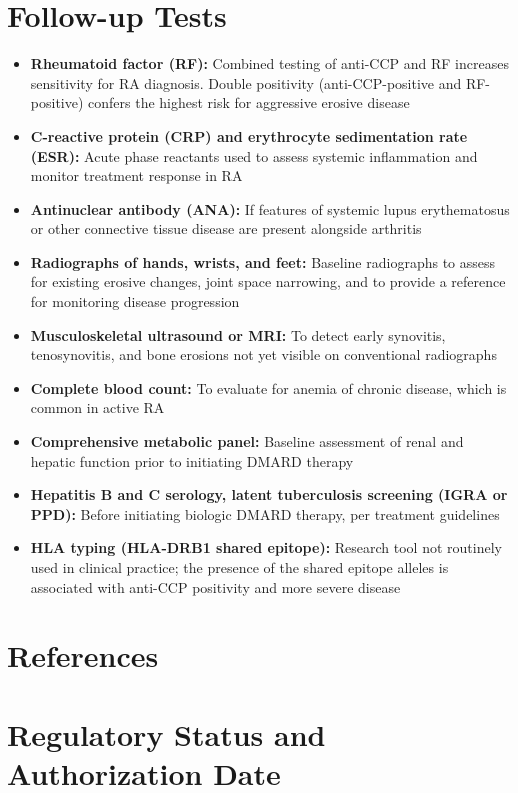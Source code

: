 \section*{Follow-up Tests}
\begin{itemize}
  \item \textbf{Rheumatoid factor (RF):} Combined testing of anti-CCP and RF increases sensitivity for RA diagnosis. Double positivity (anti-CCP-positive and RF-positive) confers the highest risk for aggressive erosive disease
  \item \textbf{C-reactive protein (CRP) and erythrocyte sedimentation rate (ESR):} Acute phase reactants used to assess systemic inflammation and monitor treatment response in RA
  \item \textbf{Antinuclear antibody (ANA):} If features of systemic lupus erythematosus or other connective tissue disease are present alongside arthritis
  \item \textbf{Radiographs of hands, wrists, and feet:} Baseline radiographs to assess for existing erosive changes, joint space narrowing, and to provide a reference for monitoring disease progression
  \item \textbf{Musculoskeletal ultrasound or MRI:} To detect early synovitis, tenosynovitis, and bone erosions not yet visible on conventional radiographs
  \item \textbf{Complete blood count:} To evaluate for anemia of chronic disease, which is common in active RA
  \item \textbf{Comprehensive metabolic panel:} Baseline assessment of renal and hepatic function prior to initiating DMARD therapy
  \item \textbf{Hepatitis B and C serology, latent tuberculosis screening (IGRA or PPD):} Before initiating biologic DMARD therapy, per treatment guidelines
  \item \textbf{HLA typing (HLA-DRB1 shared epitope):} Research tool not routinely used in clinical practice; the presence of the shared epitope alleles is associated with anti-CCP positivity and more severe disease
\end{itemize}

\section*{References}



\clearpage
\section*{Regulatory Status and Authorization Date}

\clearpage
